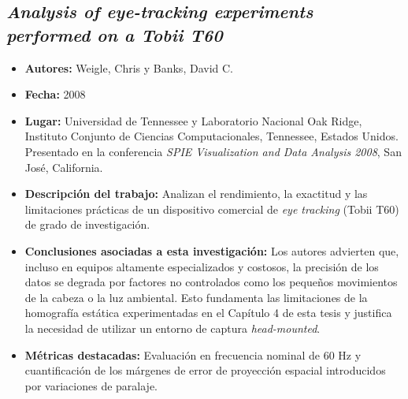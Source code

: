 \subsection{\textit{Analysis of eye-tracking experiments performed on a Tobii T60}}
\begin{itemize}
	\item \textbf{Autores:} Weigle, Chris y Banks, David C. \cite{weigle2008analysis}
	\item \textbf{Fecha:} 2008
	\item \textbf{Lugar:} Universidad de Tennessee y Laboratorio Nacional Oak Ridge, Instituto Conjunto de Ciencias Computacionales, Tennessee, Estados Unidos. Presentado en la conferencia \textit{SPIE Visualization and Data Analysis 2008}, San José, California.
	\item \textbf{Descripción del trabajo:} Analizan el rendimiento, la exactitud y las limitaciones prácticas de un dispositivo comercial de \textit{eye tracking} (Tobii T60) de grado de investigación.
	\item \textbf{Conclusiones asociadas a esta investigación:} Los autores advierten que, incluso en equipos altamente especializados y costosos, la precisión de los datos se degrada por factores no controlados como los pequeños movimientos de la cabeza o la luz ambiental. Esto fundamenta las limitaciones de la homografía estática experimentadas en el Capítulo 4 de esta tesis y justifica la necesidad de utilizar un entorno de captura \textit{head-mounted}.
	\item \textbf{Métricas destacadas:} Evaluación en frecuencia nominal de 60 Hz y cuantificación de los márgenes de error de proyección espacial introducidos por variaciones de paralaje.
\end{itemize}

